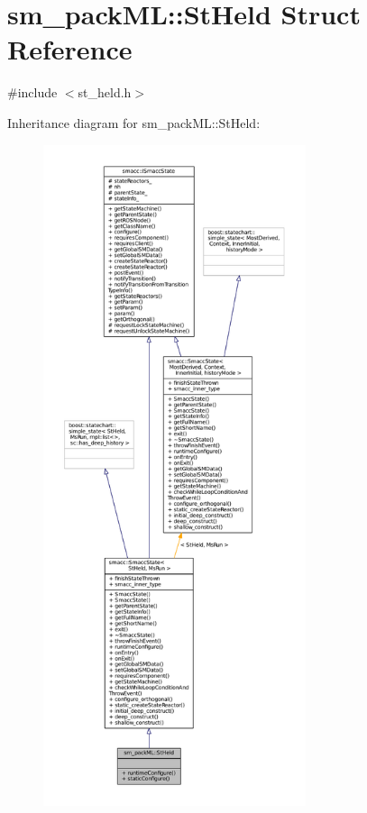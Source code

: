 \hypertarget{structsm__packML_1_1StHeld}{}\section{sm\+\_\+pack\+ML\+:\+:St\+Held Struct Reference}
\label{structsm__packML_1_1StHeld}


{\ttfamily \#include $<$st\+\_\+held.\+h$>$}



Inheritance diagram for sm\+\_\+pack\+ML\+:\+:St\+Held\+:
\nopagebreak
\begin{figure}[H]
\begin{center}
\leavevmode
\includegraphics[height=550pt]{structsm__packML_1_1StHeld__inherit__graph}
\end{center}
\end{figure}


